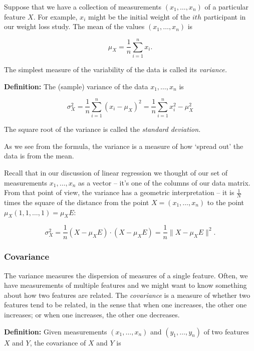 \documentclass[]{article}
\begin{document}
Suppose that we have a collection of measurements \((x_1,\ldots, x_n)\)
of a particular feature \(X\). For example, \(x_i\) might be the initial
weight of the \(ith\) participant in our weight loss study. The mean of
the values \((x_1,\ldots, x_n)\) is

\[
\mu_{X} = \frac{1}{n}\sum_{i=1}^{n} x_{i}.
\]

The simplest measure of the variability of the data is called its
\emph{variance.}

\textbf{Definition:} The (sample) variance of the data
\(x_1,\ldots, x_n\) is

\begin{equation}
\sigma_{X}^2 = \frac{1}{n}\sum_{i=1}^{n} (x_{i}-\mu_{X})^2 = \frac{1}{n}\sum_{i=1}^{n} x_{i}^2 - \mu_{X}^2
\label{eq:variance}\end{equation}

The square root of the variance is called the \emph{standard deviation.}

As we see from the formula, the variance is a measure of how `spread
out' the data is from the mean.

Recall that in our discussion of linear regression we thought of our set
of measurements \(x_1,\ldots, x_n\) as a vector -- it's one of the
columns of our data matrix. From that point of view, the variance has a
geometric interpretation -- it is \(\frac{1}{N}\) times the square of
the distance from the point \(X=(x_1,\ldots, x_n)\) to the point
\(\mu_{X}(1,1,\ldots,1)=\mu_{X}E\):

\begin{equation}
\sigma_{X}^2 = \frac{1}{n}(X-\mu_{X}E)\cdot(X-\mu_{X}E)  = \frac{1}{n}\|X-\mu_{X}E\|^2.
\label{eq:variancedot}\end{equation}

\hypertarget{covariance}{%
\subsubsection{Covariance}\label{covariance}}

The variance measures the dispersion of measures of a single feature.
Often, we have measurements of multiple features and we might want to
know something about how two features are related. The \emph{covariance}
is a measure of whether two features tend to be related, in the sense
that when one increases, the other one increases; or when one increases,
the other one decreases.

\textbf{Definition:} Given measurements \((x_1,\ldots, x_n)\) and
\((y_1,\ldots, y_n)\) of two features \(X\) and \(Y\), the covariance of
\(X\) and \(Y\) is
\end{document}

